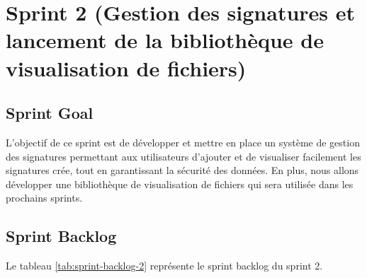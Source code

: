 \section{Sprint 2 (Gestion des signatures et lancement de la bibliothèque de visualisation de fichiers)}

\subsection{Sprint Goal}

L'objectif de ce sprint est de développer et mettre en place un système de gestion des signatures permettant aux utilisateurs d'ajouter et de visualiser facilement les signatures crée, tout en garantissant la sécurité des données. En plus, nous allons développer une bibliothèque de visualisation de fichiers qui sera utilisée dans les prochains sprints.

\subsection{Sprint Backlog}

Le tableau \ref{tab:sprint-backlog-2} représente le sprint backlog du sprint 2.

